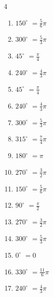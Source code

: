 \begin{multicols}{4}
\begin{enumerate}
  \item $\displaystyle 150^{\circ}$
        $\displaystyle =\frac{5}{6}\pi$

  \item $\displaystyle 300^{\circ}$
        $\displaystyle =\frac{5}{3}\pi$

  \item $\displaystyle 45^{\circ}$
        $\displaystyle =\frac{\pi}{4}$

  \item $\displaystyle 240^{\circ}$
        $\displaystyle =\frac{4}{3}\pi$

  \item $\displaystyle 45^{\circ}$
        $\displaystyle =\frac{\pi}{4}$

  \item $\displaystyle 240^{\circ}$
        $\displaystyle =\frac{4}{3}\pi$

  \item $\displaystyle 300^{\circ}$
        $\displaystyle =\frac{5}{3}\pi$

  \item $\displaystyle 315^{\circ}$
        $\displaystyle =\frac{7}{4}\pi$

  \item $\displaystyle 180^{\circ}$
        $\displaystyle =\pi$

  \item $\displaystyle 270^{\circ}$
        $\displaystyle =\frac{3}{2}\pi$

\columnbreak %

  \item $\displaystyle 150^{\circ}$
        $\displaystyle =\frac{5}{6}\pi$

  \item $\displaystyle 90^{\circ}$
        $\displaystyle =\frac{\pi}{2}$

  \item $\displaystyle 270^{\circ}$
        $\displaystyle =\frac{3}{2}\pi$

  \item $\displaystyle 300^{\circ}$
        $\displaystyle =\frac{5}{3}\pi$

  \item $\displaystyle 0^{\circ}$
        $\displaystyle =0$

  \item $\displaystyle 330^{\circ}$
        $\displaystyle =\frac{11}{6}\pi$

  \item $\displaystyle 240^{\circ}$
        $\displaystyle =\frac{4}{3}\pi$


\end{enumerate}
\end{multicols}
